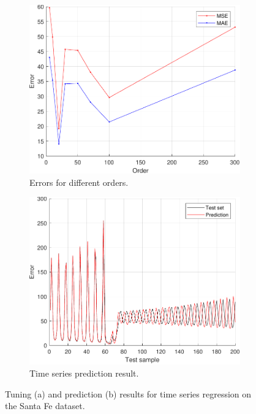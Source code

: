 \documentclass{article}
\begin{document}
        \begin{figure}[h]
             \centering
             \hspace{0.05\textwidth}
             \begin{subfigure}[b]{0.4\textwidth}
                 \centering
                 \includegraphics[width=\textwidth]{Assignment 2/figures/2_3/MSEvsMAE_ordersweep.pdf}
                 \caption{Errors for different orders.}
                 \label{fig:order_sweep_santa_fe}
             \end{subfigure}
             \hfill
             \begin{subfigure}[b]{0.4\textwidth}
                 \centering
                 \includegraphics[width=\textwidth]{Assignment 2/figures/2_3/prediction_order_20.pdf}
                 \caption{Time series prediction result.}
                 \label{fig:santafe_prediction}
             \end{subfigure}
             \hspace{0.05\textwidth}
            \caption{Tuning (a) and prediction (b) results for time series regression on the Santa Fe dataset.}
        \end{figure}
        
    
\end{document}
